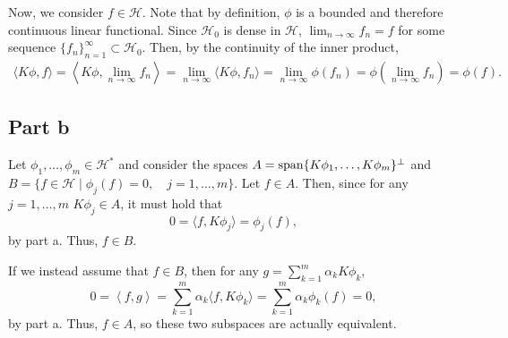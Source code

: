 \documentclass{article}
\begin{document}
Now, we consider $f\in\mathcal{H}$. Note that by definition, $\phi$ is a bounded and therefore continuous linear functional. Since $\mathcal{H}_0$ is dense in $\mathcal{H}$, $\lim_{n\to\infty}f_n=f$ for some sequence $\{f_n\}_{n=1}^\infty\subset\mathcal{H}_0$. Then, by the continuity of the inner product,
\begin{align*}
\langle K\phi,f\rangle=\left\langle K\phi,\lim_{n\to\infty}f_n\right\rangle=\lim_{n\to\infty}\langle K\phi,f_n\rangle=\lim_{n\to\infty}\phi(f_n)=\phi\left(\lim_{n\to\infty}f_n\right)=\phi(f).
\end{align*}

\subsection{Part b}
Let $\phi_1, \dots, \phi_m \in \mathcal{H}^*$ and consider the spaces $A=\operatorname{span}\{K\phi_1, \dots, K\phi_m\}^\perp$ and $B=\{f \in \mathcal{H} \mid \phi_j(f) = 0,\quad j = 1,\dots, m\}$. Let $f\in A$. Then, since for any $j=1,\ldots,m$ $K\phi_j\in A$, it must hold that
\[
0=\langle f,K\phi_j\rangle=\phi_j(f),
\]
by part a. Thus, $f\in B$. 

If we instead assume that $f\in B$, then for any $g=\sum_{k=1}^m \alpha_k K\phi_k$,
\[
0=\left\langle f,g\right\rangle=\sum_{k=1}^m \alpha_k\langle f,K\phi_k\rangle=\sum_{k=1}^m \alpha_k\phi_k(f)=0,
\] 
by part a. Thus, $f\in A$, so these two subspaces are actually equivalent.
\end{document}
